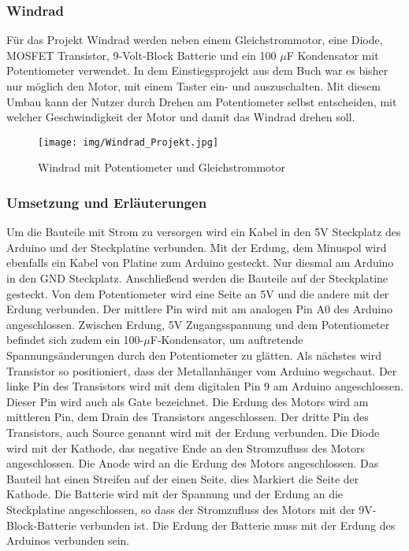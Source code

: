 \subsubsection{Windrad}

Für das Projekt Windrad werden neben einem Gleichstrommotor, eine Diode, MOSFET Transistor, 9-Volt-Block Batterie und ein 100 $\mu$F Kondensator mit Potentiometer verwendet. In dem Einstiegsprojekt aus dem Buch war es bisher nur möglich den Motor, mit einem Taster ein- und auszuschalten. Mit diesem Umbau kann der Nutzer durch Drehen am Potentiometer selbst entscheiden, mit welcher Geschwindigkeit der Motor und damit das Windrad drehen soll.
\\

\begin{figure}[h]
\begin{center}
\texttt{[image: img/Windrad\_Projekt.jpg]}
\caption{Windrad mit Potentiometer und Gleichstrommotor}
\label{Windrad_project}
\end{center}
\end{figure}
\subsubsection{Umsetzung und Erläuterungen}
Um die Bauteile mit Strom zu versorgen wird ein Kabel in den 5V Steckplatz des Arduino und der Steckplatine verbunden. Mit der Erdung, dem Minuspol wird ebenfalls ein Kabel von Platine zum Arduino gesteckt. Nur diesmal am Arduino in den GND Steckplatz. Anschließend werden die Bauteile auf der Steckplatine gesteckt. Von dem Potentiometer wird eine Seite an 5V und die andere mit der Erdung verbunden. Der mittlere Pin wird mit am analogen Pin A0 des Arduino angeschlossen. Zwischen Erdung, 5V Zugangsspannung und dem Potentiometer befindet sich zudem ein 100-$\mu$F-Kondensator, um auftretende Spannungsänderungen durch den Potentiometer zu glätten. Als nächstes wird Transistor so positioniert, dass der Metallanhänger vom Arduino wegschaut. Der linke Pin des Transistors wird mit dem digitalen Pin 9 am Arduino angeschlossen. Dieser Pin wird auch als Gate bezeichnet. Die Erdung des Motors wird am mittleren Pin, dem Drain des Transistors angeschlossen. Der dritte Pin des Transistors, auch Source genannt wird mit der Erdung verbunden. Die Diode wird mit der Kathode, das negative Ende an den Stromzufluss des Motors angeschlossen. Die Anode wird an die Erdung des Motors angeschlossen. Das Bauteil hat einen Streifen auf der einen Seite, dies Markiert die Seite der Kathode. Die Batterie wird mit der Spannung und der Erdung an die Steckplatine angeschlossen, so dass der Stromzufluss des Motors mit der 9V-Block-Batterie verbunden ist. Die Erdung der Batterie muss mit der Erdung des Arduinos verbunden sein.

